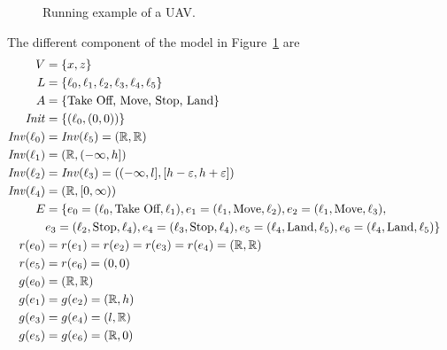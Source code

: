 \begin{ex}
\begin{figure}[H]
\begin{center}
         \caption{Running example of a UAV.}
         \label{fig:runex}
     \end{center}
 \end{figure}
The different component of the model in Figure~\ref{fig:runex} are
\begin{align*}
    V & = \{x,z\} \\
    L & = \{\ell_{0},\ell_{1},\ell_{2},\ell_{3},\ell_{4},\ell_{5}\} \\
    A & = \{\text{Take Off, Move, Stop, Land}\} \\
    \Init & = \{(\ell_{0},(0,0))\} \\
    \Inv(\ell_{0}) & = \Inv(\ell_{5}) = (\mathbb{R},\mathbb{R})\\
    \Inv(\ell_{1}) & = (\mathbb{R},(-\infty,h])\\
    \Inv(\ell_{2}) & = \Inv(\ell_{3}) = ((-\infty,l],[h-\varepsilon,h+\varepsilon])\\
    \Inv(\ell_{4}) & = (\mathbb{R},[0,\infty))\\
    E & = \{e_{0}=(\ell_{0},\text{Take Off},\ell_{1}), e_{1}=(\ell_{1},\text{Move},\ell_{2}), e_{2}=(\ell_{1},\text{Move},\ell_{3}), & \\
    & e_{3}=(\ell_{2},\text{Stop},\ell_{4}), e_{4}=(\ell_{3},\text{Stop},\ell_{4}), e_{5}=(\ell_{4},\text{Land},\ell_{5}), e_{6}=(\ell_{4},\text{Land},\ell_{5}) \} \\
    r(e_{0}) & = r(e_{1}) = r(e_{2}) = r(e_{3}) = r(e_{4}) = (\mathbb{R},\mathbb{R}) \\
    r(e_{5}) & = r(e_{6}) = (0,0) \\
    g(e_{0}) & = (\mathbb{R},\mathbb{R}) \\
    g(e_{1}) & = g(e_{2}) = (\mathbb{R},h) \\
    g(e_{3}) & = g(e_{4}) = (l,\mathbb{R}) \\
    g(e_{5}) & = g(e_{6}) = (\mathbb{R},0) \\

\end{align*}
\end{ex}
